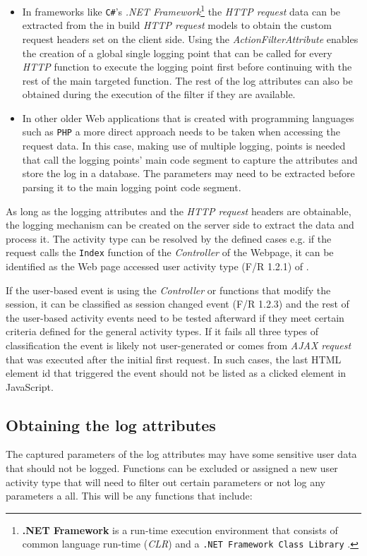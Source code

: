 \begin{itemize}
	\item In frameworks like \texttt{C\#}'s \emph{.NET Framework}\footnote{\label{ftn:ch2_NetFramework}\textbf{.NET Framework} is a run-time execution environment that consists of common language run-time (\emph{CLR}) and a \texttt{.NET Framework Class Library} \cite{Harkness2007}.} the \textit{HTTP request} data can be extracted from the in build \textit{HTTP request} models to obtain the custom request headers set on the client side. Using the \textit{ActionFilterAttribute} enables the creation of a global single logging point that can be called for every \textit{HTTP} function to execute the logging point first before continuing with the rest of the main targeted function. The rest of the log attributes can also be obtained during the execution of the filter if they are available. 
	\item In other older Web applications that is created with programming languages such as \texttt{PHP} a more direct approach needs to be taken when accessing the request data. In this case, making use of multiple logging, points is needed that call the logging points' main code segment to capture the attributes and store the log in a database. The parameters may need to be extracted before parsing it to the main logging point code segment.
\end{itemize}

As long as the logging attributes and the \textit{HTTP request} headers are obtainable, the logging mechanism can be created on the server side to extract the data and process it. The activity type can be resolved by the defined cases e.g. if the request calls the \texttt{Index} function of the \textit{Controller} of the Webpage, it can be identified as the Web page accessed user activity type (F/R 1.2.1) of .\par If the user-based event is using the \textit{Controller} or functions that modify the session, it can be classified as session changed event (F/R 1.2.3) and the rest of the user-based activity events need to be tested afterward if they meet certain criteria defined for the general activity types. If it fails all three types of classification the event is likely not user-generated or comes from \textit{AJAX request} that was executed after the initial first request. In such cases, the last HTML element id that triggered the event should not be listed as a clicked element in JavaScript. \

\subsection{Obtaining the log attributes}
The captured parameters of the log attributes may have some sensitive user data that should not be logged. Functions can be excluded or assigned a new user activity type that will need to filter out certain parameters or not log any parameters a all. This will be any functions that include:

